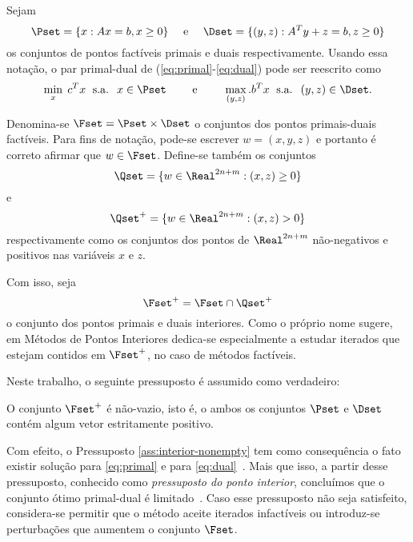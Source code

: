 Sejam
\begin{equation}
\label{eq:primal-dual-feas-set}
\Pset = \{x : Ax = b, x\geq 0\} \quad\text{ e } \quad
\Dset = \{ (y,z) : A^Ty + z = b, z\geq 0\}
\end{equation}
 os conjuntos de pontos factíveis primais e duais 
respectivamente. Usando essa notação, o par primal-dual de
(\ref{eq:primal}-\ref{eq:dual}) pode ser reescrito como
\begin{equation}
\label{eq:primal-dual-reescrito}
\min_x\; c^Tx \; \text{ s.a. }\; x\in \Pset \qquad\text{ e } \qquad
\max_{(y,z)}.
b^Tx \; \text{ s.a. }\; (y,z) \in \Dset.
\end{equation}


Denomina-se $\Fset = \Pset\times\Dset$ o conjuntos dos pontos primais-duais
factíveis.
 Para fins de notação, pode-se escrever $w = (x,y,z)$ e portanto é correto
 afirmar que $w\in\Fset$. Define-se também os conjuntos \[ \Qset =
 \{w\in\Real^{2n+m}:(x,z)\geq 0\} \] e \[ \Qset^+ = \{w\in\Real^{2n+m}:(x,z) >
 0\} \] respectivamente  como os
conjuntos dos pontos de $\Real^{2n+m}$ não-negativos e positivos nas variáveis
$x$ e $z$.



Com isso, seja
\[  \Fset^+ = \Fset \cap \Qset^+\] o conjunto dos
pontos primais e duais interiores. Como o próprio nome sugere, em Métodos de 
Pontos Interiores dedica-se especialmente a estudar iterados que estejam
contidos em $\Fset^+$, no caso de métodos factíveis.


Neste trabalho, o seguinte pressuposto é assumido como verdadeiro:

\begin{pressup}\label{ass:interior-nonempty}
 O conjunto $\Fset^+$ é não-vazio, isto é, o ambos os conjuntos $\Pset$ e
 $\Dset$ contém algum vetor estritamente positivo.
\end{pressup}




Com efeito,   o Pressuposto \ref{ass:interior-nonempty} tem como
consequência o fato existir  solução para
\eqref{eq:primal} e para \eqref{eq:dual}~\cite[Teorema 3.1]{Guler:1995wf}.
Mais que isso, a partir desse pressuposto, conhecido como \emph{pressuposto do
ponto interior}, concluímos que o conjunto ótimo primal-dual  é
limitado~\cite[Lema 2.2]{Guler:1995tn}.  Caso
esse pressuposto não seja satisfeito, considera-se permitir que o método aceite
iterados infactíveis ou introduz-se perturbações que aumentem o conjunto
$\Fset$.

  


